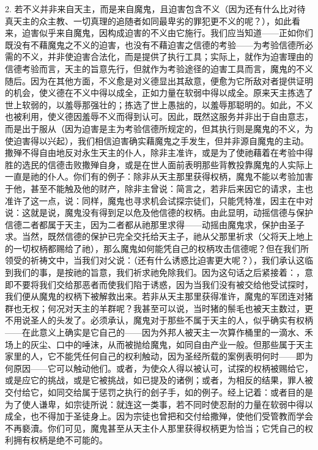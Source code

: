 2. 若不义并非来自天主，而是来自魔鬼，且迫害包含不义（因为还有什么比对待真天主的众主教、一切真理的追随者如同最卑劣的罪犯更不义的呢？），如此看来，迫害似乎来自魔鬼，因构成迫害的不义由它施行。我们应当知道——正如你们既没有不藉魔鬼之不义的迫害，也没有不藉迫害之信德的考验——为考验信德所必需的不义，并非使迫害合法化，而是提供了执行工具；实际上，就作为迫害理由的信德考验而言，天主的旨意先行，但就作为考验途径的迫害工具而言，魔鬼的不义随后。因为在其他方面，不义愈是对义德显出其敌意，便愈为它所敌对者提供证明的机会，使义德在不义中得以成全，正如力量在软弱中得以成全。原来天主拣选了世上软弱的，以羞辱那强壮的；拣选了世上愚拙的，以羞辱那聪明的。如此，不义也被利用，使义德因羞辱不义而得到认可。因此，既然这服务并非出于自由意志，而是出于服从（因为迫害是主为考验信德所规定的，但其执行则是魔鬼的不义，为使迫害得以兴起），我们相信迫害确实藉魔鬼之手发生，但并非源自魔鬼的主动。撒殚不得自由地反对永生天主的仆人，除非主准许，或是为了使祂藉着在考验中得胜的选民的信德击败撒殚自身，或是在世人面前表明那些背教投靠魔鬼的人实际上一直是祂的仆人。你们有的例子：除非从天主那里获得权柄，魔鬼不能以考验加害于他，甚至不能触及他的财产，除非主曾说：简言之，若非后来因它的请求，主也准许了这一点，说：同样，魔鬼也寻求机会试探宗徒们，只能凭特准，因主在中对说：这就是说，魔鬼没有得到足以危及他信德的权柄。由此显明，动摇信德与保护信德二者都属于天主，因为二者都从祂那里求得——动摇由魔鬼求，保护由圣子求。当然，既然信德的保护已完全交托给天主子，祂从父那里祈求（父将天上地上的一切权柄都赐给了祂），那么魔鬼如何能凭自己的权柄攻击信德呢？但在我们所领受的祈祷文中，当我们对父说：（还有什么诱惑比迫害更大呢？），我们承认这临到我们的事，是按祂的旨意，我们祈求祂免除我们。因为这句话之后紧接着：，意即不要将我们交给那恶者而使我们陷于诱惑，因为当我们没有被交给他受试探时，我们便从魔鬼的权柄下被解救出来。若非从天主那里获得准许，魔鬼的军团连对猪群也无权；何况对天主的羊群呢？我甚至可以说，当时猪的鬃毛也被天主数过，更不用说圣人的头发了。必须承认，魔鬼对于那些不属于天主的人，似乎确实有权柄——在此意义上确实是它自己的——因为外邦人被天主一次算作桶里的一滴水、禾场上的灰尘、口中的唾沫，从而被抛给魔鬼，如同自由产业一般。但那些属于天主家里的人，它不能凭任何自己的权利触动，因为圣经所载的案例表明何时——即为何原因——它可以触动他们。或者，为使众人得以被认可，试探的权柄被赐给它，或是应它的挑战，或是它被挑战，如已提及的诸例；或者，为相反的结果，罪人被交付给它，如同交给属于惩罚之执行的刽子手，如的例子。经上记着：或者目的是为了使人谦卑，如宗徒所说：就连这一类事，若不同时使忍耐的力量在软弱中得以成全，也不得加于圣徒身上。因为宗徒也曾把和交付给撒殚，使他们受管教而学会不再褻瀆。你们可见，魔鬼甚至从天主仆人那里获得权柄更为恰当；它凭自己的权利拥有权柄是绝不可能的。\par

